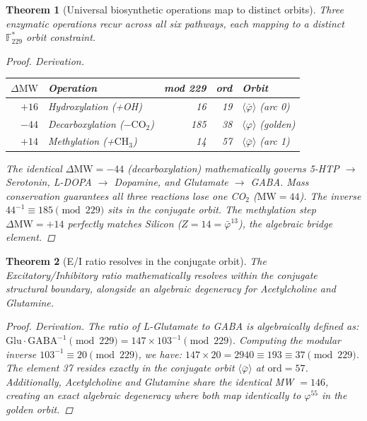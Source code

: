 \documentclass[12pt,oneside]{article}
\theoremstyle{principia}
\newtheorem{theorem}{Theorem}[section]
\theoremstyle{definition}
\theoremstyle{remark}
\providecommand{\vp}{\varphi}
\providecommand{\vpbar}{\bar{\varphi}}
\begin{document}
\begin{theorem}[Universal biosynthetic operations map to distinct orbits]
Three enzymatic operations recur across all six pathways, each mapping to a distinct $\mathbb{F}_{229}^*$ orbit constraint.
\begin{proof}
\emph{Derivation.}
\begin{center}
\begin{tabular}{@{}rlrrl@{}}
\toprule
$\Delta\mathrm{MW}$ & \textbf{Operation} & \textbf{mod 229} & \textbf{ord} & \textbf{Orbit} \\
\midrule
$+16$ & Hydroxylation (+OH) & 16 & 19 & $\langle\vpbar\rangle$ (arc 0) \\
$-44$ & Decarboxylation ($-\mathrm{CO}_2$) & 185 & 38 & $\langle\vp\rangle$ (golden) \\
$+14$ & Methylation (+$\mathrm{CH}_3$) & 14 & 57 & $\langle\vpbar\rangle$ (arc 1) \\
\bottomrule
\end{tabular}
\end{center}
The identical $\Delta\mathrm{MW} = -44$ (decarboxylation) mathematically governs 5-HTP $\to$ Serotonin, L-DOPA $\to$ Dopamine, and Glutamate $\to$ GABA. Mass conservation guarantees all three reactions lose one CO$_2$ ($\mathrm{MW} = 44$). The inverse $44^{-1} \equiv 185 \pmod{229}$ sits in the conjugate orbit. The methylation step $\Delta\mathrm{MW} = +14$ perfectly matches Silicon ($Z = 14 = \vpbar^{13}$), the algebraic bridge element.
\qedhere
\end{proof}
\end{theorem}

\begin{theorem}[E/I ratio resolves in the conjugate orbit]
The Excitatory/Inhibitory ratio mathematically resolves within the conjugate structural boundary, alongside an algebraic degeneracy for Acetylcholine and Glutamine.
\begin{proof}
\emph{Derivation.} The ratio of L-Glutamate to GABA is algebraically defined as:
$\mathrm{Glu} \cdot \mathrm{GABA}^{-1} \pmod{229} = 147 \times 103^{-1} \pmod{229}$.
Computing the modular inverse $103^{-1} \equiv 20 \pmod{229}$, we have:
$147 \times 20 = 2940 \equiv 193 \equiv 37 \pmod{229}$.
The element 37 resides exactly in the conjugate orbit $\langle\vpbar\rangle$ at $\mathrm{ord} = 57$. Additionally, Acetylcholine and Glutamine share the identical MW $= 146$, creating an exact algebraic degeneracy where both map identically to $\vp^{55}$ in the golden orbit.
\qedhere
\end{proof}
\end{theorem}
\end{document}
